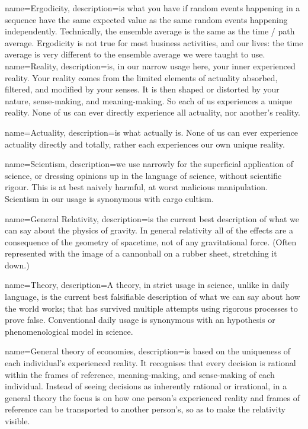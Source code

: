 ﻿%
{
  name=Ergodicity,
  description={is what you have if random events happening in a sequence have the same expected value as the same random events happening independently. Technically, the ensemble average is the same as the time / path average. Ergodicity is not true for most business activities, and our lives: the time average is very different to the ensemble average we were taught to use.}
}
{
  name=Reality,
  description={is, in our narrow usage here, your inner experienced reality. Your reality comes from the limited elements of actuality absorbed, filtered, and modified by your senses. It is then shaped or distorted by your nature, sense-making, and meaning-making. So each of us experiences a unique reality. None of us can ever directly experience all actuality, nor another’s reality.}
}


{
  name=Actuality,
  description={is what actually is. None of us can ever experience actuality directly and totally, rather each experiences our own unique reality.}
}




{
  name=Scientism,
  description={we use narrowly for the superficial application of science, or dressing opinions up in the language of science, without scientific rigour. This is at best naively harmful, at worst malicious manipulation. Scientism in our usage is synonymous with cargo cultism.}
}


{
  name=General Relativity,
  description={is the current best description of what we can say about the physics of gravity. In general relativity all of the effects are a consequence of the geometry of spacetime, not of any gravitational force.  (Often represented with the image of a cannonball on a rubber sheet, stretching it down.)}
}  


{
  name=Theory,
  description={A theory, in strict usage in science, unlike in daily language, is the current best falsifiable description of what we can say about how the world works; that has survived multiple attempts using rigorous processes to prove false.  Conventional daily usage is synonymous with an hypothesis or phenomenological model in science.}
}




{
  name=General theory of economies,
  description={is based on the uniqueness of each individual’s experienced reality. It recognises that every decision is rational within the frames of reference, meaning\hyp{}making, and sense\hyp{}making of each individual. Instead of seeing decisions as inherently rational or irrational, in a general theory the focus is on how one person’s experienced reality and frames of reference  can be transported to another person’s, so as to make the relativity visible.}
}




